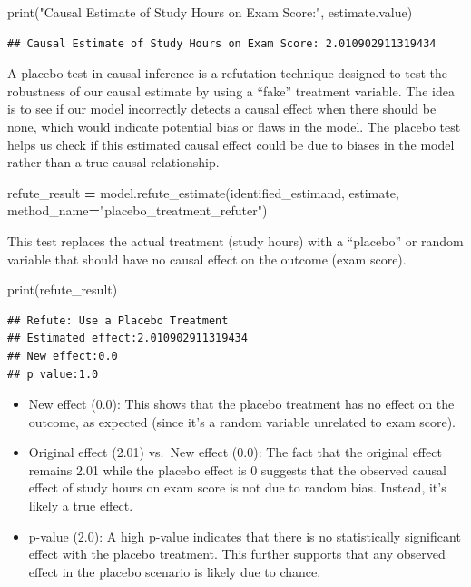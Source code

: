 \documentclass[
  12pt,
]{book}
\newenvironment{Shaded}{\begin{snugshade}}{\end{snugshade}}
\newcommand{\BuiltInTok}[1]{#1}
\newcommand{\NormalTok}[1]{#1}
\newcommand{\OperatorTok}[1]{\textcolor[rgb]{0.81,0.36,0.00}{\textbf{#1}}}
\newcommand{\StringTok}[1]{\textcolor[rgb]{0.31,0.60,0.02}{#1}}
\begin{document}
\begin{Shaded}
\begin{Highlighting}[]
\BuiltInTok{print}\NormalTok{(}\StringTok{"Causal Estimate of Study Hours on Exam Score:"}\NormalTok{, }
\NormalTok{     estimate.value)}
\end{Highlighting}
\end{Shaded}

\begin{verbatim}
## Causal Estimate of Study Hours on Exam Score: 2.010902911319434
\end{verbatim}

A placebo test in causal inference is a refutation technique designed to test the robustness of our causal estimate by using a ``fake'' treatment variable. The idea is to see if our model incorrectly detects a causal effect when there should be none, which would indicate potential bias or flaws in the model. The placebo test helps us check if this estimated causal effect could be due to biases in the model rather than a true causal relationship.

\begin{Shaded}
\begin{Highlighting}[]
\NormalTok{refute\_result }\OperatorTok{=}\NormalTok{ model.refute\_estimate(identified\_estimand, }
\NormalTok{  estimate, method\_name}\OperatorTok{=}\StringTok{"placebo\_treatment\_refuter"}\NormalTok{)}
\end{Highlighting}
\end{Shaded}

This test replaces the actual treatment (study hours) with a ``placebo'' or random variable that should have no causal effect on the outcome (exam score).

\begin{Shaded}
\begin{Highlighting}[]
\BuiltInTok{print}\NormalTok{(refute\_result)}
\end{Highlighting}
\end{Shaded}

\begin{verbatim}
## Refute: Use a Placebo Treatment
## Estimated effect:2.010902911319434
## New effect:0.0
## p value:1.0
\end{verbatim}

\begin{itemize}
\item
  New effect (0.0): This shows that the placebo treatment has no effect on the outcome, as expected (since it's a random variable unrelated to exam score).
\item
  Original effect (2.01) vs.~New effect (0.0): The fact that the original effect remains 2.01 while the placebo effect is 0 suggests that the observed causal effect of study hours on exam score is not due to random bias. Instead, it's likely a true effect.
\item
  p-value (2.0): A high p-value indicates that there is no statistically significant effect with the placebo treatment. This further supports that any observed effect in the placebo scenario is likely due to chance.
\end{itemize}
\end{document}
